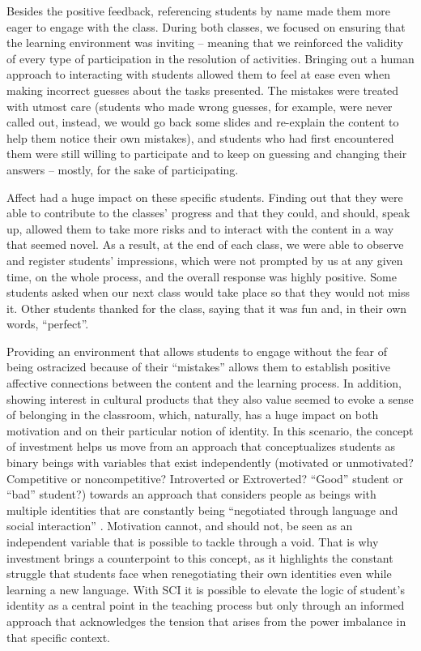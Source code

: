 \documentclass[english]{textolivre}
\begin{document}
 Besides the positive feedback, referencing students by name made them more eager to engage with the class. During both classes, we focused on ensuring that the learning environment was inviting – meaning that we reinforced the validity of every type of participation in the resolution of activities. Bringing out a human approach to interacting with students allowed them to feel at ease even when making incorrect guesses about the tasks presented. The mistakes were treated with utmost care (students who made wrong guesses, for example, were never called out, instead, we would go back some slides and re-explain the content to help them notice their own mistakes), and students who had first encountered them were still willing to participate and to keep on guessing and changing their answers – mostly, for the sake of participating.

Affect had a huge impact on these specific students. Finding out that they were able to contribute to the classes’ progress and that they could, and should, speak up, allowed them to take more risks and to interact with the content in a way that seemed novel. As a result, at the end of each class, we were able to observe and register students’ impressions, which were not prompted by us at any given time, on the whole process, and the overall response was highly positive. Some students asked when our next class would take place so that they would not miss it. Other students thanked for the class, saying that it was fun and, in their own words, “perfect”.

Providing an environment that allows students to engage without the fear of being ostracized because of their “mistakes” allows them to establish positive affective connections between the content and the learning process. In addition, showing interest in cultural products that they also value seemed to evoke a sense of belonging in the classroom, which, naturally, has a huge impact on both motivation and on their particular notion of identity. In this scenario, the concept of investment helps us move from an approach that conceptualizes students as binary beings with variables that exist independently (motivated or unmotivated? Competitive or noncompetitive? Introverted or Extroverted? “Good” student or “bad” student?) towards an approach that considers people as beings with multiple identities that are constantly being “negotiated through language and social interaction” \cite[p. 3]{darvin2023investment}. Motivation cannot, and should not, be seen as an independent variable that is possible to tackle through a void. That is why investment brings a counterpoint to this concept, as it highlights the constant struggle that students face when renegotiating their own identities even while learning a new language. With SCI it is possible to elevate the logic of student’s identity as a central point in the teaching process but only through an informed approach that acknowledges the tension that arises from the power imbalance in that specific context.
\end{document}
